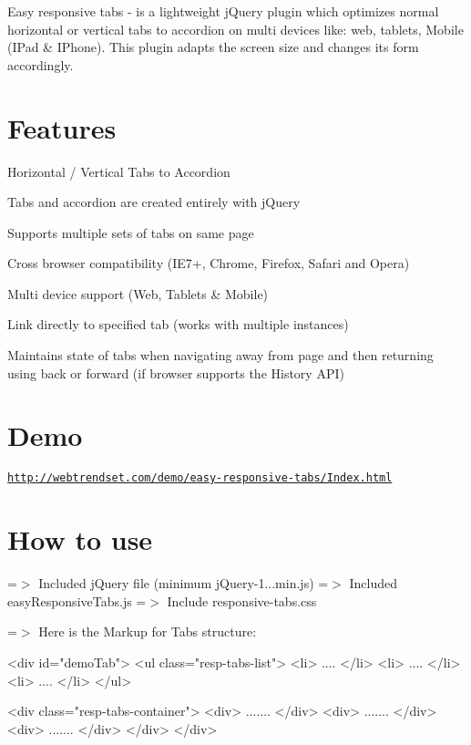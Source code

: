 Easy responsive tabs -\/ is a lightweight j\-Query plugin which optimizes normal horizontal or vertical tabs to accordion on multi devices like\-: web, tablets, Mobile (I\-Pad \& I\-Phone). This plugin adapts the screen size and changes its form accordingly.

\section*{Features }


\begin{DoxyItemize}
\item Horizontal / Vertical Tabs to Accordion
\item Tabs and accordion are created entirely with j\-Query
\item Supports multiple sets of tabs on same page
\item Cross browser compatibility (I\-E7+, Chrome, Firefox, Safari and Opera)
\item Multi device support (Web, Tablets \& Mobile)
\item Link directly to specified tab (works with multiple instances)
\item Maintains state of tabs when navigating away from page and then returning using back or forward (if browser supports the History A\-P\-I)
\end{DoxyItemize}

\section*{Demo }

\href{http://webtrendset.com/demo/easy-responsive-tabs/Index.html}{\tt http\-://webtrendset.\-com/demo/easy-\/responsive-\/tabs/\-Index.\-html}

\section*{How to use }

=$>$ Included j\-Query file (minimum j\-Query-\/1...\-min.\-js) =$>$ Included easy\-Responsive\-Tabs.\-js =$>$ Include responsive-\/tabs.\-css

=$>$ Here is the Markup for Tabs structure\-: \begin{DoxyVerb}    <div id="demoTab">          
        <ul class="resp-tabs-list">
            <li> .... </li>
            <li> .... </li>
            <li> .... </li>
        </ul> 

        <div class="resp-tabs-container">                                                        
            <div> ....... </div>
            <div> ....... </div>
            <div> ....... </div>
        </div>
    </div>    
\end{DoxyVerb}


